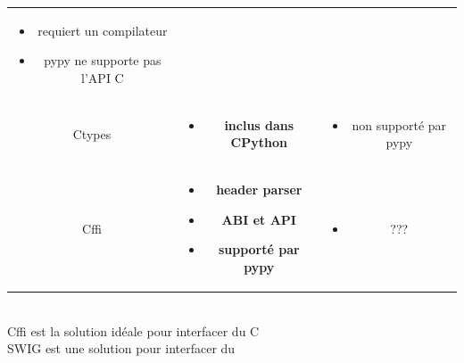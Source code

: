 \begin{frame}
\begin{center}
\begin{tabular}{ccc}
\begin{minipage}[t]{.45\linewidth}
\begin{itemize}
        \item requiert un compilateur
        \item pypy ne supporte pas l'API C
        \end{itemize}
      \end{minipage} \\[1em] %
      Ctypes &
      \begin{minipage}[t]{.2\linewidth}
        \tiny
        \begin{itemize}
        \item \textbf{inclus dans CPython}
        \end{itemize}
      \end{minipage} &
      \begin{minipage}[t]{.45\linewidth}
        \tiny
        \begin{itemize}
          \item non supporté par pypy
        \end{itemize}
      \end{minipage} \\[1em]
      Cffi &
      \begin{minipage}[t]{.2\linewidth}
        \tiny
        \begin{itemize}
        \item \textbf{header parser}
        \item \textbf{ABI et API}
        \item \textbf{supporté par pypy}
        \end{itemize}
      \end{minipage} &
      \begin{minipage}[t]{.45\linewidth}
        \tiny
        \begin{itemize}
        \item ???
        \end{itemize}
      \end{minipage}
    \end{tabular} \\[1em]
    \alert{Cffi est la solution idéale pour interfacer du C} \\[.5em]
    \alert{SWIG est une solution pour interfacer du \Cpp}
  \end{center}
  \note{
    \begin{enumerate}
    \item
    \end{enumerate}
  }
\end{frame}

